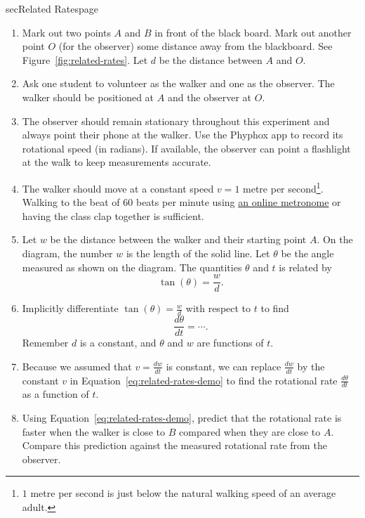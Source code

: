 \documentclass[../main]{subfiles}
\begin{document}
\begin{outline}{sec}{Related Rates}{page}
\begin{enumerate}
      \begin{enumerate}
        \item Mark out two points \(A\) and \(B\) in front of the black board. Mark out another point \(O\) (for the observer) some distance away from the blackboard. See Figure~\ref{fig:related-rates}.  Let \(d\) be the distance between \(A\) and \(O\).
        \item Ask one student to volunteer as the walker and one as the observer. The walker should be positioned at \(A\) and the observer at \(O\).
        \item The observer should remain stationary throughout this experiment and always point their phone at the walker. Use the Phyphox app to record its rotational speed (in radians). If available, the observer can point a flashlight at the walk to keep measurements accurate. 
        \item The walker should move at a constant speed \(v = 1\) metre per second\footnote{\(1\) metre per second is just below the natural walking speed of an average adult.}. Walking to the beat of 60 beats per minute using \href{https://www.metronomeonline.com/}{an online metronome} or having the class clap together is sufficient.
        \item Let \(w\) be the distance between the walker and their starting point \(A\).  On the diagram, the number \(w\) is the length of the solid line. Let \(\theta\) be the angle measured as shown on the diagram.  The quantities \(\theta\) and \(t\) is related by
          \[
            \tan(\theta) = \frac{w}{d}.
          \]
        \item Implicitly differentiate \(\tan(\theta) = \frac{w}{d}\) with respect to \(t\) to find
          \begin{equation} \label{eq:related-rates-demo}
            \frac{d\theta}{dt} = \cdots.
          \end{equation}
          Remember \(d\) is a constant, and \(\theta\) and \(w\) are functions of \(t\).
        \item Because we assumed that \(v = \frac{dw}{dt}\) is constant, we can replace \(\frac{dw}{dt}\) by the constant \(v\) in Equation~\eqref{eq:related-rates-demo} to find the rotational rate \(\frac{d\theta}{dt}\) as a function of \(t\).
        \item Using Equation~\eqref{eq:related-rates-demo}, predict that the rotational rate is faster when the walker is close to \(B\) compared when they are close to \(A\).  Compare this prediction against the measured rotational rate from the observer.
      \end{enumerate}


\end{enumerate}
\end{outline}
\end{document}
